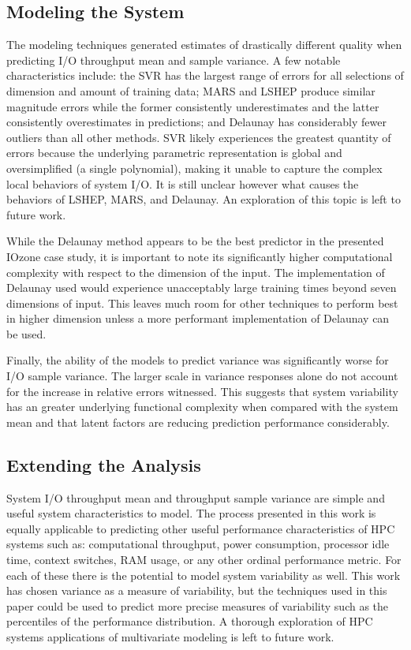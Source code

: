 \documentclass{scspaperproc}
\theoremstyle{scsthe}
\begin{document}
\subsection{Modeling the System}

The modeling techniques generated estimates of drastically different
quality when predicting I/O throughput mean and sample variance. A few
notable characteristics include: the SVR has the largest range of
errors for all selections of dimension and amount of training data;
MARS and LSHEP produce similar magnitude errors while the former
consistently underestimates and the latter consistently overestimates
in predictions; and Delaunay has considerably fewer outliers than all
other methods. SVR likely experiences the greatest quantity of errors
because the underlying parametric representation is global and
oversimplified (a single polynomial), making it unable to capture the
complex local behaviors of system I/O. It is still unclear however
what causes the behaviors of LSHEP, MARS, and Delaunay. An exploration
of this topic is left to future work.

While the Delaunay method appears to be the best predictor in the
presented IOzone case study, it is important to note its significantly
higher computational complexity with respect to the dimension of the
input. The implementation of Delaunay used would experience
unacceptably large training times beyond seven dimensions of
input. This leaves much room for other techniques to perform best in
higher dimension unless a more performant implementation of Delaunay
can be used.

Finally, the ability of the models to predict variance was
significantly worse for I/O sample variance. The larger scale in
variance responses alone do not account for the increase in relative
errors witnessed. This suggests that system variability has an greater
underlying functional complexity when compared with the system mean
and that latent factors are reducing prediction performance
considerably.

\subsection{Extending the Analysis}

System I/O throughput mean and throughput sample variance are simple
and useful system characteristics to model. The process presented in
this work is equally applicable to predicting other useful performance
characteristics of HPC systems such as: computational throughput,
power consumption, processor idle time, context switches, RAM usage,
or any other ordinal performance metric. For each of these there is
the potential to model system variability as well. This work has
chosen variance as a measure of variability, but the techniques used
in this paper could be used to predict more precise measures of
variability such as the percentiles of the performance distribution. A
thorough exploration of HPC systems applications of multivariate
modeling is left to future work.
\end{document}

